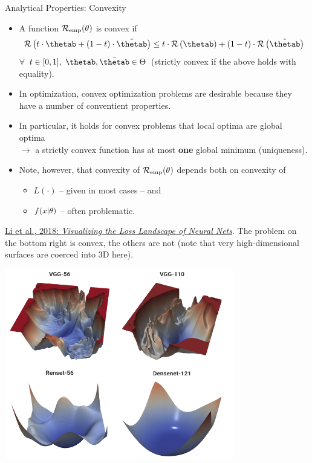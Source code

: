\begin{vbframe}{Analytical Properties: Convexity}

\begin{itemize}
  \footnotesize
  \item A function $\mathcal{R}_{\text{emp}}(\theta)$ is convex if
  $$
    \risk\left(t \cdot \thetab + (1 - t) \cdot \tilde \thetab\right) \le t \cdot
    \risk\left(\thetab\right) + (1 - t) \cdot \risk\left(\tilde \thetab \right)
  $$
  $\forall$ $t \in [0, 1], ~\thetab, \tilde \thetab \in \Theta$
  (strictly convex if the above holds with equality).
  \item In optimization, convex optimization problems are desirable because 
  they have a number of conventient properties. 
  \item In particular, it holds for convex problems that local optima are 
  global optima \\$\rightarrow$ a strictly convex function has at most 
  \textbf{one} global minimum (uniqueness). 
  \item Note, however, that convexity of $\mathcal{R}_{\text{emp}}(\theta)$ depends both on convexity of 
  \begin{itemize} 
    \footnotesize
    \item $L(\cdot)$ -- given in most cases -- and 
    \item $f(x | \theta)$ -- often problematic.
  \end{itemize}  
\end{itemize} 

\vfill

\begin{minipage}[b]{0.5\textwidth}
  \footnotesize \raggedright
  \href{https://arxiv.org/pdf/1712.09913.pdf}{Li et al., 2018: 
  \textit{Visualizing the Loss Landscape of Neural Nets}}. 
  The problem on the bottom right is convex, the others are not (note that 
  very high-dimensional surfaces are coerced into 3D here).  
  \\
  \phantom{foo}
\end{minipage}%
\begin{minipage}[b]{0.05\textwidth}
  \phantom{foo}
\end{minipage}%
\begin{minipage}[b]{0.45\textwidth}
  \includegraphics[width=0.75\textwidth]{
  figure_man/convex-vs-nonconfex-landscape}
\end{minipage}%

\end{vbframe}


